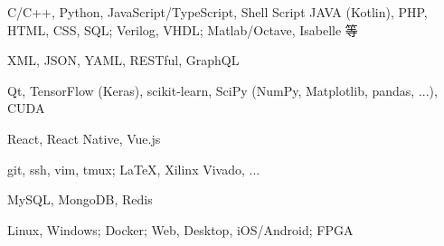 
\begin{cvtbl}

        {C/C++, Python, JavaScript/TypeScript, Shell Script}
        {JAVA (Kotlin), PHP, HTML, CSS, SQL; Verilog, VHDL; Matlab/Octave, Isabelle 等}

        {XML, JSON, YAML, RESTful, GraphQL}

        {Qt, TensorFlow (Keras), scikit-learn, SciPy (NumPy, Matplotlib, pandas, ...), CUDA}

        {React, React Native, Vue.js}

        {git, ssh, vim, tmux; \LaTeX, Xilinx Vivado, ...}

        {MySQL, MongoDB, Redis}

        {Linux, Windows; Docker; Web, Desktop, iOS/Android; FPGA}
\end{cvtbl}

\endinput